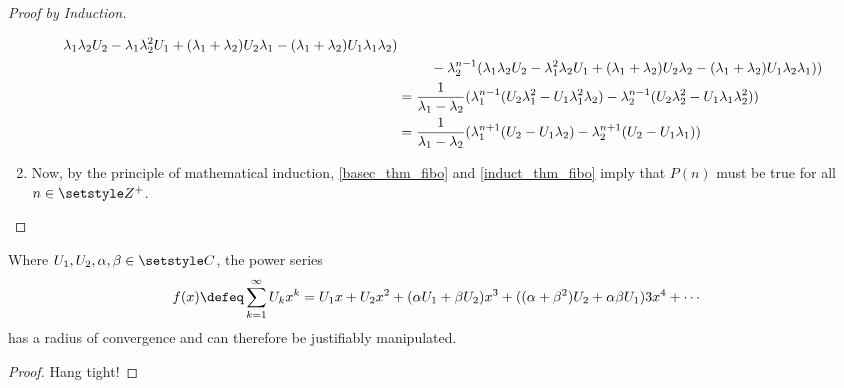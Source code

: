\begin{proof}[Proof by Induction]
\begin{enumerate}[label=\Roman*.]
\begin{alignat*}
                        \lambda_1 \lambda_2 U_2 -
                        \lambda_1 \lambda_2^2 U_1 +
                        (\lambda_1 + \lambda_2) U_2 \lambda_1 -
                        (\lambda_1 + \lambda_2) U_1 \lambda_1 \lambda_2) \\
              &&{}-{}& \lambda_2^{n - 1}(
                        \lambda_1 \lambda_2 U_2 -
                        \lambda_1^2 \lambda_2 U_1 +
                        (\lambda_1 + \lambda_2) U_2 \lambda_2 -
                        (\lambda_1 + \lambda_2) U_1 \lambda_2 \lambda_1)
                      ) \\
                   &= \mathrlap{
                       \frac 1{\lambda_1 - \lambda_2}(
                        \lambda_1^{n - 1}(
                         U_2 \lambda_1^2 - U_1 \lambda_1^2 \lambda_2)
                      - \lambda_2^{n - 1}(
                         U_2 \lambda_2^2 - U_1 \lambda_1 \lambda_2^2)
                      )} \\
                   &= \mathrlap{
                       \frac 1{\lambda_1 - \lambda_2}(
                        \lambda_1^{n + 1}(
                         U_2 - U_1 \lambda_2)
                      - \lambda_2^{n + 1}(
                         U_2 - U_1 \lambda_1)
                      )}
        \end{alignat*}
  \item Now, by the principle of mathematical induction, \ref{basec_thm_fibo}
        and \ref{induct_thm_fibo} imply that \(P(n)\) must be true for all \(n
        \in \Integers^+\). \qedhere
 \end{enumerate}
\end{proof}
\begin{lemma}
\label{lem_fibo_convergence}
 Where \(U_1, U_2, \alpha, \beta \in \Complex\), the power series
 \begin{equation*}
  f(x) \defeq \sum_{k=1}^\infty U_k x^k
            = U_1 x + U_2 x^2 + (\alpha U_1 + \beta U_2) x^3
            + ((\alpha + \beta^2)U_2 + \alpha \beta U_1)3x^4 + \dotsb
 \end{equation*}
 has a radius of convergence and can therefore be justifiably manipulated.
\end{lemma}
\begin{proof}
 Hang tight!
\end{proof}
